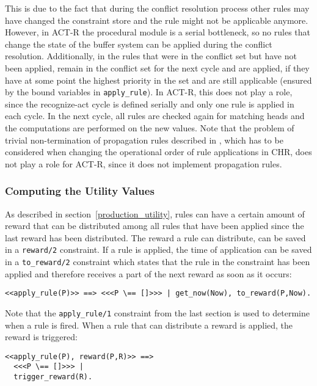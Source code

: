 This is due to the fact that during the conflict resolution process other rules may have changed the constraint store and the rule might not be applicable anymore. However, in ACT-R the procedural module is a serial bottleneck, so no rules that change the state of the buffer system can be applied during the conflict resolution. Additionally, in \cite{fru_chr_book_2009} the rules that were in the conflict set but have not been applied, remain in the conflict set for the next cycle and are applied, if they have at some point the highest priority in the set and are still applicable (ensured by the bound variables in \lstinline|apply_rule|). In ACT-R, this does not play a role, since the recognize-act cycle is defined serially and only one rule is applied in each cycle. In the next cycle, all rules are checked again for matching heads and the computations are performed on the new values. Note that the problem of trivial non-termination of propagation rules described in \cite[5]{abdennadher_sts_chr13}, which has to be considered when changing the operational order of rule applications in CHR, does not play a role for ACT-R, since it does not implement propagation rules.

\subsubsection{Computing the Utility Values}

As described in section~\ref{production_utility}, rules can have a certain amount of reward that can be distributed among all rules that have been applied since the last reward has been distributed. The reward a rule can distribute, can be saved in a \lstinline|reward/2| constraint. If a rule is applied, the time of application can be saved in a \lstinline|to_reward/2| constraint which states that the rule in the constraint has been applied and therefore receives a part of the next reward as soon as it occurs: 

\begin{lstlisting}
<<apply_rule(P)>> ==> <<<P \== []>>> | get_now(Now), to_reward(P,Now).
\end{lstlisting}

Note that the \lstinline|apply_rule/1| constraint from the last section is used to determine when a rule is fired. When a rule that can distribute a reward is applied, the reward is triggered:

\begin{lstlisting}
<<apply_rule(P), reward(P,R)>> ==>
  <<<P \== []>>> |
  trigger_reward(R).
\end{lstlisting}

